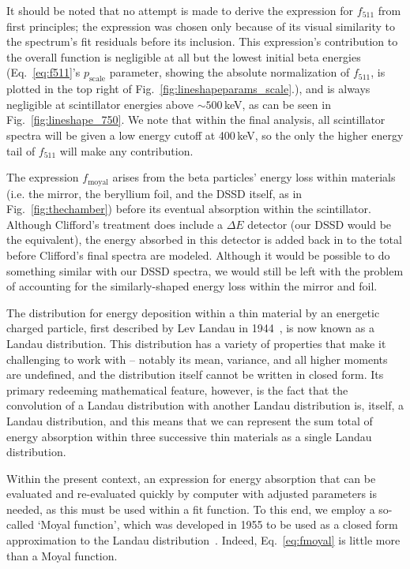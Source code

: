 It should be noted that no attempt is made to derive the expression for $f_{511}$ from first principles; the expression was chosen only because of its visual similarity to the spectrum's fit residuals before its inclusion.  This expression's contribution to the overall function is negligible at all but the lowest initial beta energies (Eq.~\ref{eq:f511}'s $p_{\mathrm{scale}}$ parameter, showing the absolute normalization of $f_{511}$, is plotted in the top right of Fig.~\ref{fig:lineshapeparams_scale}.), and is always negligible at scintillator energies above $\sim 500\,$keV, as can be seen in Fig.~\ref{fig:lineshape_750}.  We note that within the final analysis, all scintillator spectra will be given a low energy cutoff at 400\,keV, so the only the higher energy tail of $f_{511}$ will make any contribution.   

The expression $f_{\mathrm{moyal}}$ arises from the beta particles' energy loss within materials (i.e. the mirror, the beryllium foil, and the DSSD itself, as in Fig.~\ref{fig:thechamber}) before its eventual absorption within the scintillator.  Although Clifford's treatment does include a $\Delta E$ detector (our DSSD would be the equivalent), the energy absorbed in this detector is added back in to the total before Clifford's final spectra are modeled.  Although it would be possible to do something similar with our DSSD spectra,  we would still be left with the problem of accounting for the similarly-shaped energy loss within the mirror and foil. 

The distribution for energy deposition within a thin material by an energetic charged particle, first described by Lev Landau in 1944~\cite{landaudistribution}, is now known as a Landau distribution.  This distribution has a variety of properties that make it challenging to work with -- notably its mean, variance, and all higher moments are undefined, and the distribution itself cannot be written in closed form.  Its primary redeeming mathematical feature, however, is the fact that the convolution of a Landau distribution with another Landau distribution is, itself, a Landau distribution, and this means that we can represent the sum total of energy absorption within three successive thin materials as a single Landau distribution.  

Within the present context, an expression for energy absorption that can be evaluated and re-evaluated quickly by computer with adjusted parameters is needed, as this must be used within a fit function.  To this end, we employ a so-called `Moyal function', which was developed in 1955 to be used as a closed form approximation to the Landau distribution~\cite{moyal}.  Indeed, Eq.~\ref{eq:fmoyal} is little more than a Moyal function.  

